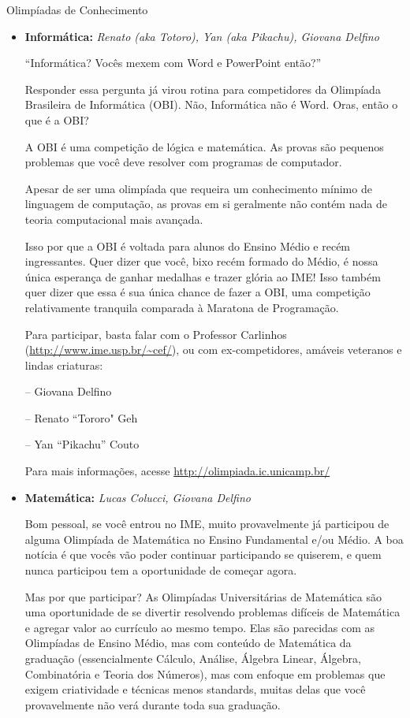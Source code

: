 \begin{secao}{Olimpíadas de Conhecimento}

\begin{itemize}

\item{\bf Informática: }
{\em Renato (aka Totoro), Yan (aka Pikachu), Giovana Delfino} %

``Informática? Vocês mexem com Word e PowerPoint então?''

Responder essa pergunta já virou rotina para competidores da
Olimpíada Brasileira de Informática (OBI). Não, Informática 
não é Word. Oras, então o que é a OBI?

A OBI é uma competição de lógica e matemática. As provas são pequenos
problemas que você deve resolver com programas de computador.

Apesar de ser uma olimpíada que requeira um conhecimento mínimo de 
linguagem de computação, as provas em si geralmente não contém nada 
de teoria computacional mais avançada. 

Isso por que a OBI é voltada para alunos do Ensino Médio e recém
ingressantes. Quer dizer que você, bixo recém formado do Médio,
é nossa única esperança de ganhar medalhas e trazer glória ao IME!
Isso também quer dizer que essa é sua única chance de fazer a OBI,
uma competição relativamente tranquila comparada à Maratona de 
Programação.

Para participar, basta falar com o Professor Carlinhos (\url{http://www.ime.usp.br/~cef/}), 
ou com ex-competidores, amáveis veteranos e lindas criaturas:

-- Giovana Delfino

-- Renato ``Tororo" Geh

-- Yan ``Pikachu'' Couto

Para mais informações, acesse \url{http://olimpiada.ic.unicamp.br/}

\item{\bf Matemática: }
{\em Lucas Colucci, Giovana Delfino} %

Bom pessoal, se você entrou no IME, muito provavelmente já participou
de alguma Olimpíada de Matemática no Ensino Fundamental e/ou Médio. A 
boa notícia é que vocês vão poder continuar participando se quiserem,
e quem nunca participou tem a oportunidade de começar agora.

Mas por que participar? As Olimpíadas Universitárias de Matemática são uma
oportunidade de se divertir resolvendo problemas difíceis de Matemática e agregar
valor ao currículo ao mesmo tempo. Elas são parecidas com as Olimpíadas de
Ensino Médio, mas com conteúdo de Matemática da graduação (essencialmente 
Cálculo, Análise, Álgebra Linear, Álgebra, Combinatória e Teoria dos Números), 
mas com enfoque em problemas que exigem criatividade e técnicas menos standards,
muitas delas que você provavelmente não verá durante toda sua graduação.


\end{itemize}
\end{secao}
